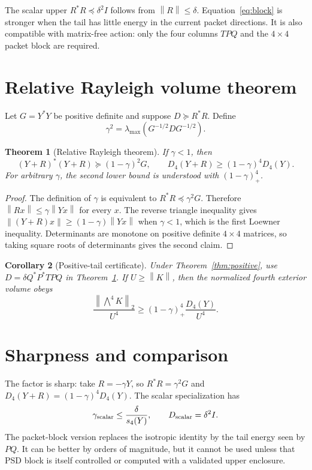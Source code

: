 \documentclass[12pt]{article}
\newtheorem{theorem}{Theorem}\newtheorem{proposition}[theorem]{Proposition}\newtheorem{corollary}[theorem]{Corollary}\newtheorem{remark}[theorem]{Remark}
\newcommand{\norm}[1]{\left\lVert#1\right\rVert}
\begin{document}
The scalar upper $R^*R\preceq\delta^2I$ follows from $\norm R\leq\delta$.
Equation~\eqref{eq:block} is stronger when the tail has little energy in the
current packet directions.  It is also compatible with matrix-free action:
only the four columns $TPQ$ and the $4\times4$ packet block are required.

\section{Relative Rayleigh volume theorem}
Let $G=Y^*Y$ be positive definite and suppose $D\succeq R^*R$.  Define
\[
 \gamma^2=\lambda_{\max}(G^{-1/2}DG^{-1/2}).
\]

\begin{theorem}[Relative Rayleigh theorem]\label{thm:rayleigh}
If $\gamma<1$, then
\begin{equation}\label{eq:rayleigh}
 (Y+R)^*(Y+R)\succeq(1-\gamma)^2G,
 \qquad
 D_4(Y+R)\geq(1-\gamma)^4D_4(Y).
\end{equation}
For arbitrary $\gamma$, the second lower bound is understood with
$(1-\gamma)_+^4$.
\end{theorem}
\begin{proof}
The definition of $\gamma$ is equivalent to $R^*R\preceq\gamma^2G$.
Therefore $\norm{Rx}\leq\gamma\norm{Yx}$ for every $x$.  The reverse
triangle inequality gives
$\norm{(Y+R)x}\geq(1-\gamma)\norm{Yx}$ when $\gamma<1$, which is the first
Loewner inequality.  Determinants are monotone on positive definite
$4\times4$ matrices, so taking square roots of determinants gives the second
claim.
\end{proof}

\begin{corollary}[Positive-tail certificate]
Under Theorem~\ref{thm:positive}, use
$D=\delta Q^*P^*TPQ$ in Theorem~\ref{thm:rayleigh}.  If $U\geq\norm K$,
then the normalized fourth exterior volume obeys
\[
 \frac{\norm{\bigwedge^4K}_2}{U^4}
 \geq (1-\gamma)_+^4\frac{D_4(Y)}{U^4}.
\]
\end{corollary}

\section{Sharpness and comparison}
The factor is sharp: take $R=-\gamma Y$, so $R^*R=\gamma^2G$ and
$D_4(Y+R)=(1-\gamma)^4D_4(Y)$.  The scalar specialization has
\[
 \gamma_{\rm scalar}\leq\frac{\delta}{s_4(Y)},
 \qquad D_{\rm scalar}=\delta^2I.
\]
The packet-block version replaces the isotropic identity by the tail energy
seen by $PQ$.  It can be better by orders of magnitude, but it cannot be
used unless that PSD block is itself controlled or computed with a validated
upper enclosure.
\end{document}
